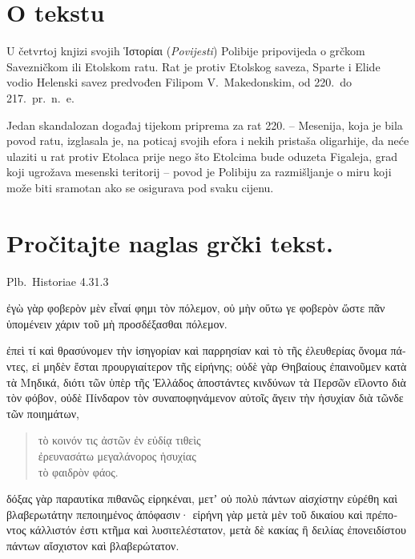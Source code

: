 

\section*{O tekstu}

U četvrtoj knjizi svojih \textgreek[variant=ancient]{Ἱστορίαι} (\textit{Povijesti}) Polibije pripovijeda o grčkom Savezničkom ili Etolskom ratu. Rat je protiv Etolskog saveza, Sparte i Elide vodio Helenski savez predvođen Filipom V.\ Makedonskim, od 220.\ do 217.\ pr.~n.~e.

Jedan skandalozan događaj tijekom priprema za rat 220. – Mesenija, koja je bila povod ratu, izglasala je, na poticaj svojih efora i nekih pristaša oligarhije, da neće ulaziti u rat protiv Etolaca prije nego što Etolcima bude oduzeta Figaleja, grad koji ugrožava mesenski teritorij – povod je Polibiju za razmišljanje o miru koji može biti sramotan ako se osigurava pod svaku cijenu.





\section*{Pročitajte naglas grčki tekst.}

Plb.\ Historiae 4.31.3

\medskip


{\large

\begin{greek}

\noindent ἐγὼ γὰρ φοβερὸν μὲν εἶναί φημι τὸν πόλεμον, οὐ μὴν οὕτω γε φοβερὸν ὥστε πᾶν ὑπομένειν χάριν τοῦ μὴ προσδέξασθαι πόλεμον.

\noindent ἐπεὶ τί καὶ θρασύνομεν τὴν ἰσηγορίαν καὶ παρρησίαν καὶ τὸ τῆς ἐλευθερίας ὄνομα πάντες, εἰ μηδὲν ἔσται προυργιαίτερον τῆς εἰρήνης; οὐδὲ γὰρ Θηβαίους ἐπαινοῦμεν κατὰ τὰ Μηδικά, διότι τῶν ὑπὲρ τῆς Ἑλλάδος ἀποστάντες κινδύνων τὰ Περσῶν εἵλοντο διὰ τὸν φόβον, οὐδὲ Πίνδαρον τὸν συναποφηνάμενον αὐτοῖς ἄγειν τὴν ἡσυχίαν διὰ τῶνδε τῶν ποιημάτων,
\begin{verse}
τὸ κοινόν τις ἀστῶν ἐν εὐδίᾳ τιθεὶς\\
ἐρευνασάτω μεγαλάνορος ἡσυχίας\\
τὸ φαιδρὸν φάος.\\

\end{verse}
δόξας γὰρ παραυτίκα πιθανῶς εἰρηκέναι, μετʼ οὐ πολὺ πάντων αἰσχίστην εὑρέθη καὶ βλαβερωτάτην πεποιημένος ἀπόφασιν· εἰρήνη γὰρ μετὰ μὲν τοῦ δικαίου καὶ πρέποντος κάλλιστόν ἐστι κτῆμα καὶ λυσιτελέστατον, μετὰ δὲ κακίας ἢ δειλίας ἐπονειδίστου πάντων αἴσχιστον καὶ βλαβερώτατον.

\end{greek}

}

